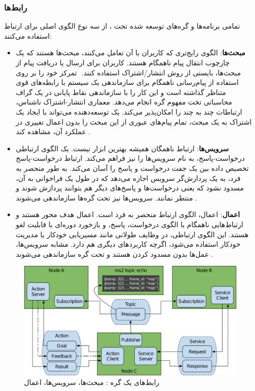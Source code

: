 \subsubsection{رابط‌ها}
تمامی برنامه‌ها و گره‌های توسعه شده تحت ، از  سه نوع الگوی اصلی برای ارتباط استفاده می‌کنند:
\begin{itemize}
    \item \textbf{‌مبحث‌ها}: الگوی رایج‌تری که کاربران با آن تعامل می‌کنند، مبحث‌ها هستند که یک چارچوب انتقال پیام ناهمگام هستند. کاربران برای ارسال یا دریافت پیام از مبحث‌ها، بایستی از روش انتشار/اشتراک استفاده کنند. ‌ تمرکز خود را بر روی استفاده از پیام‌رسانی ناهمگام برای سازماندهی یک سیستم با رابطه‌های قوی متناظر گذاشته است و این کار را با سازماندهی نقاط پایانی در یک گراف محاسباتی تخت مفهوم گره انجام می‌دهد. معماری انتشار-اشتراک ناشناس، ارتباطات چند به چند را امکان‌پذیر می‌کند. یک توسعه‌دهنده می‌تواند با ایجاد یک اشتراک به یک مبحث، تمام پیام‌های عبوری از این مبحث را بدون اعمال تغییری در عملکرد آن، مشاهده کند \cite{doi:10.1126/scirobotics.abm6074}.
    \item \textbf{سرویس‌ها}: ارتباط ناهمگان همیشه بهترین ابزار نیست.  یک الگوی ارتباطی درخواست-پاسخ، به نام سرویس‌ها را نیز فراهم می‌کند. ارتباط درخواست-پاسخ تخصیص داده بین یک جفت درخواست و پاسخ را آسان می‌کند. به طور منحصر به فرد،  به یک پردازش‌گر سرویس اجازه می‌دهد که در طول یک فراخوانی به آن، مسدود نشود که یعنی در‌خواست‌ها و پاسخ‌های دیگر هم بتوانند پردازش شوند و منتظر نمانند. سرویس‌ها نیز تحت گره‌ها سازماندهی می‌شوند \cite{doi:10.1126/scirobotics.abm6074}. 
    \item \textbf{اعمال}: اعمال، الگوی ارتباط منحصر‌ به‌ فرد  است. اعمال هدف محور هستند و ارتباط‌هایی ناهمگام با الگوی درخواست، پاسخ، و بازخورد دوره‌ای با قابلیت لغو هستند. این الگوی ارتباطی، در وظایف طولانی مانند مسیریابی خودکار یا مدیریت خودکار استفاده می‌شود، اگرچه کاربردهای دیگری هم دارد. مشابه سرویس‌ها، عمل‌ها بدون مسدود کردن هستند و تحت گره سازماندهی می‌شوند \cite{doi:10.1126/scirobotics.abm6074}.
\end{itemize}

\begin{figure}[h!]
    \centering
    \includegraphics[width=1\linewidth]{figures/ROS2_Node_Interfaces.png}
    \caption{رابط‌های یک گره : مبحث‌ها، سرویس‌ها، اعمال \cite{doi:10.1126/scirobotics.abm6074}}
    \label{fig:ROS2_Node_Interfaces}
\end{figure}

